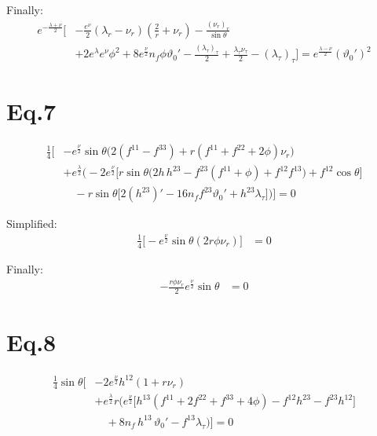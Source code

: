\documentclass[12pt]{article}
\begin{document}
Finally:
\begin{align*}
e^{-\frac{\lambda + \nu}{2}} \Big[
 &- \frac{e^{\nu}}{2} \left( \lambda_r - \nu_r \right) \left(\frac{2}{r} + \nu_r\right)
 - \frac{(\nu_r)_r}{\sin\theta} \\
 &+ 2 e^{\lambda} e^{\nu} \phi^2
 + 8 e^{\frac{\nu}{2}} n_f\phi\vartheta_0'
 - \frac{(\lambda_\tau)_\tau}{2} + \frac{\lambda_\tau \nu_\tau}{2} -(\lambda_\tau)_\tau
\Big] = e^\frac{\lambda - \nu}{2} (\vartheta_0')^2
\end{align*}

\section*{Eq.7}

\begin{align*}
\frac{1}{4} \Big[
 & - e^{\frac{\nu}{2}} \sin\theta
   \Big(
     2(f^{11} - f^{33})
     + r(f^{11} + f^{22} + 2\phi)\nu_r
   \Big) \\
 & + e^{\frac{\lambda}{2}}
   \Big(
     -2 e^{\frac{\nu}{2}} \big[
       r \sin\theta \big(
         2h\,h^{23}
         - f^{23}(f^{11} + \phi)
         + f^{12}f^{13}
       \big)
       + f^{12}\cos\theta
     \big] \\
 & \quad - r \sin\theta
       \big[
         2(h^{23})'
         - 16n_f f^{23}\vartheta_0'
         + h^{23}\lambda_\tau
       \big]
   \Big)
\Big] = 0
\end{align*}

Simplified:
\begin{align*}
\frac{1}{4} \Big[- e^{\frac{\nu}{2}} \sin\theta (2r\phi\nu_r) \Big] &= 0
\end{align*}

Finally:
\begin{align*}
- \frac{r \phi \nu_r}{2} e^{\frac{\nu}{2}} \sin\theta &= 0
\end{align*}

\section*{Eq.8}

\begin{align*}
\frac{1}{4} \sin\theta \Big[
 & -2 e^{\frac{\nu}{2}}
   h^{12}\left(1 + r\nu_r\right) \\
 & + e^{\frac{\lambda}{2}} r
   \Big(
     e^{\frac{\nu}{2}} \big[
       h^{13}(f^{11} + 2f^{22} + f^{33} + 4\phi)
       - f^{12}h^{23}
       - f^{23}h^{12}
     \big] \\
     & \quad + 8n_f\,h^{13}\,\vartheta_0'
     - f^{13}\lambda_\tau
   \Big)
\Big] = 0
\end{align*}
\end{document}
